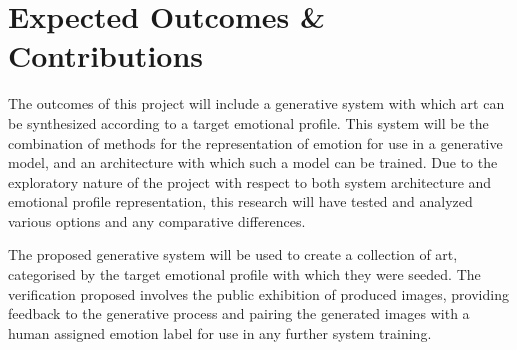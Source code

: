 \documentclass{article}
\begin{document}
\section{Expected Outcomes \& Contributions}

The outcomes of this project will include a generative system with which art can be synthesized according to a target emotional profile.
This system will be the combination of methods for the representation of emotion for use in a generative model, and an architecture with which such a model can be trained.
Due to the exploratory nature of the project with respect to both system architecture and emotional profile representation, this research will have tested and analyzed various options and any comparative differences.

The proposed generative system will be used to create a collection of art, categorised by the target emotional profile with which they were seeded.
The verification proposed involves the public exhibition of produced images, providing feedback to the generative process and pairing the generated images with a human assigned emotion label for use in any further system training.




\end{document}
